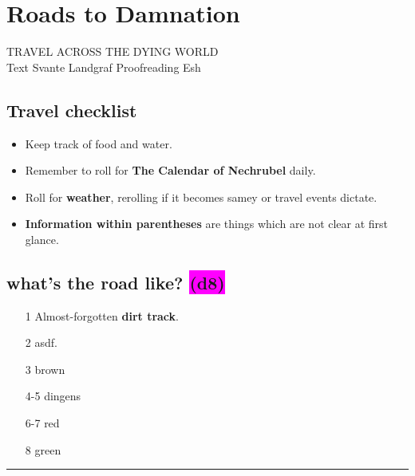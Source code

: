 \documentclass[twoside, a5paper, 9pt, openright]{memoir}
\newcommand{\DEight}[2]{\colorbox{magenta}{\textbf{#1(d8)#2}}}
\begin{document}
\chapter{Roads to Damnation}
TRAVEL ACROSS THE DYING WORLD\\
Text Svante Landgraf Proofreading Esh
\onecolumn
\setlength{\columnsep}{0.5cm}
\setlength{\columnseprule}{0.4pt}
\begin{multicols}{2}
	\section*{Travel checklist}
	\begin{itemize}
		\item Keep track of food and water.
		\item Remember to roll for \textbf{The Calendar of Nechrubel} daily.
		\item Roll for \textbf{weather}, rerolling if it becomes samey or travel events dictate.
		\item \textbf{Information within parentheses} are things which are not clear at first glance.
	\end{itemize}

	\section*{what's the road like? \DEight{}{}}
	\begin{enumerate}
		\item[1] Almost-forgotten \textbf{dirt track}.
		\item[2] asdf.
		\item[3] brown
		\item[4-5] dingens
		\item[6-7] red
		\item[8] green
	\end{enumerate}
\end{multicols}
\hrule
\hfill \break
\hfill \break
\hfill \break
\end{document}
